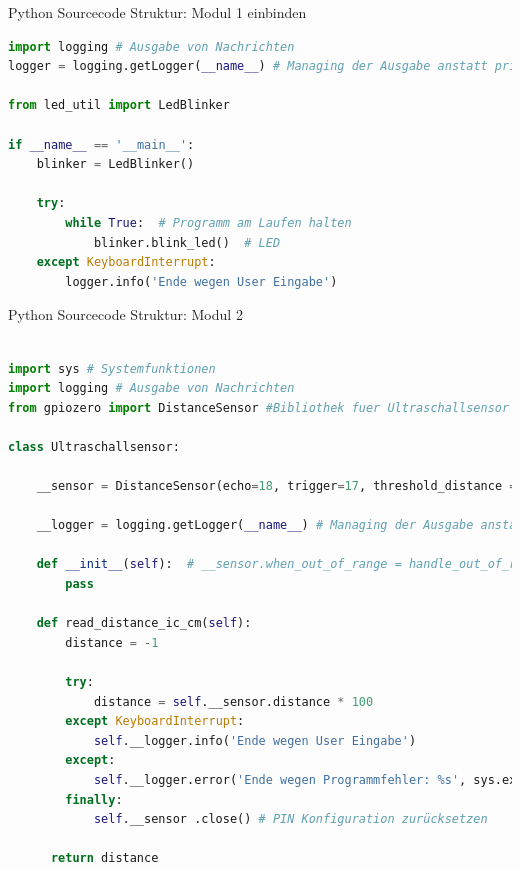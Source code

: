 \begin{frame}[fragile]{Python Sourcecode Struktur: Modul 1 einbinden}
\begin{lstlisting}[language=Python]
import logging # Ausgabe von Nachrichten
logger = logging.getLogger(__name__) # Managing der Ausgabe anstatt print() Funktion

from led_util import LedBlinker

if __name__ == '__main__':
    blinker = LedBlinker()

    try:
        while True:  # Programm am Laufen halten
            blinker.blink_led()  # LED
    except KeyboardInterrupt:
        logger.info('Ende wegen User Eingabe')
\end{lstlisting}
\end{frame}


\begin{frame}[fragile]{Python Sourcecode Struktur: Modul 2}
\begin{lstlisting}[language=Python]

import sys # Systemfunktionen
import logging # Ausgabe von Nachrichten
from gpiozero import DistanceSensor #Bibliothek fuer Ultraschallsensor

class Ultraschallsensor:

    __sensor = DistanceSensor(echo=18, trigger=17, threshold_distance = 0.1, max_distance=1) #  Sensor Kontrolle für GPIO PIN  Input 17 und Output 18 an private Variable zuweisen

    __logger = logging.getLogger(__name__) # Managing der Ausgabe anstatt print() Funktion

    def __init__(self):  # __sensor.when_out_of_range = handle_out_of_range # Funktion, die z.B. loggt
        pass

    def read_distance_ic_cm(self):
        distance = -1

        try:
            distance = self.__sensor.distance * 100
        except KeyboardInterrupt:
            self.__logger.info('Ende wegen User Eingabe')
        except:
            self.__logger.error('Ende wegen Programmfehler: %s', sys.exc_info()[0]) # siehe https://docs.python.org/3/tutorial/errors.html
        finally:
            self.__sensor .close() # PIN Konfiguration zurücksetzen

      return distance
\end{lstlisting}
\end{frame}

